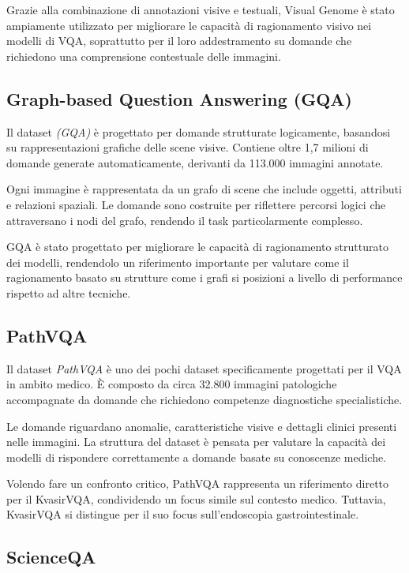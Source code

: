 \documentclass[../main.tex]{subfiles}
\begin{document}
Grazie alla combinazione di annotazioni visive e testuali, Visual Genome è stato ampiamente utilizzato per migliorare le capacità di ragionamento visivo nei modelli di VQA, soprattutto per il loro addestramento su domande che richiedono una comprensione contestuale delle immagini.

\subsection{Graph-based Question Answering (GQA)}

Il dataset \textit{(GQA)} \cite{liang2021graghvqalanguageguidedgraphneural} è progettato per domande strutturate logicamente, basandosi su rappresentazioni grafiche delle scene visive. Contiene oltre 1,7 milioni di domande generate automaticamente, derivanti da 113.000 immagini annotate.

Ogni immagine è rappresentata da un grafo di scene che include oggetti, attributi e relazioni spaziali. Le domande sono costruite per riflettere percorsi logici che attraversano i nodi del grafo, rendendo il task particolarmente complesso.

GQA è stato progettato per migliorare le capacità di ragionamento strutturato dei modelli, rendendolo un riferimento importante per valutare come il ragionamento basato su strutture come i grafi si posizioni a livello di performance rispetto ad altre tecniche.

\subsection{PathVQA}

Il dataset \textit{PathVQA} \cite{he2020pathvqa30000questionsmedical} è uno dei pochi dataset specificamente progettati per il VQA in ambito medico. È composto da circa 32.800 immagini patologiche accompagnate da domande che richiedono competenze diagnostiche specialistiche.

Le domande riguardano anomalie, caratteristiche visive e dettagli clinici presenti nelle immagini. La struttura del dataset è pensata per valutare la capacità dei modelli di rispondere correttamente a domande basate su conoscenze mediche.

Volendo fare un confronto critico, PathVQA rappresenta un riferimento diretto per il KvasirVQA, condividendo un focus simile sul contesto medico. Tuttavia, KvasirVQA si distingue per il suo focus sull'endoscopia gastrointestinale.

\subsection{ScienceQA}
\end{document}
